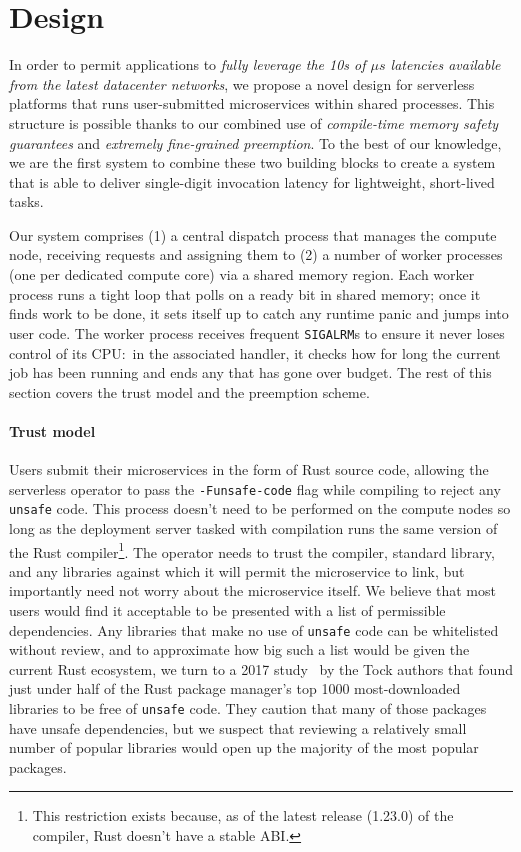 \section{Design}
\label{sec:design}

In order to permit applications to \textit{fully leverage the 10s of $\mu{}s$
latencies available from the latest datacenter networks}, we propose a novel design
for serverless platforms that runs user-submitted microservices within shared
processes.  This structure is possible thanks to our combined use of
\textit{compile-time memory safety guarantees} and \textit{extremely fine-grained
preemption}.  To the best of our knowledge, we are the first system to combine these
two building blocks to create a system that is able to deliver single-digit
invocation latency for lightweight, short-lived tasks.

Our system comprises (1) a central dispatch process that manages the compute node,
receiving requests and assigning them to (2) a number of worker processes (one per
dedicated compute core) via a shared memory region.  Each worker process runs a
tight loop that polls on a ready bit in shared memory; once it finds work to be done,
it sets itself up to catch any runtime panic and jumps into user code.  The worker
process receives frequent \texttt{SIGALRM}s to ensure it never loses control of its
CPU:\ in the associated handler, it checks how for long the current job has been
running and ends any that has gone over budget.  The rest of this section covers the
trust model and the preemption scheme.

\paragraph{Trust model}
Users submit their microservices in the form of Rust source code, allowing the
serverless operator to pass the \texttt{-Funsafe-code} flag while compiling to reject
any \texttt{unsafe} code.  This process doesn't need to be performed on the compute
nodes so long as the deployment server tasked with compilation runs the same version
of the Rust compiler\footnote{This restriction exists because, as of the latest
release (1.23.0) of the compiler, Rust doesn't have a stable ABI.}.  The operator
needs to trust the compiler, standard library, and any libraries against which it
will permit the microservice to link, but importantly need not worry about the
microservice itself.  We believe that most users would find it acceptable to be
presented with a list of permissible dependencies.  Any libraries that make no use of
\texttt{unsafe} code can be whitelisted without review, and to approximate how big
such a list would be given the current Rust ecosystem, we turn to a 2017
study~\cite{www-cratesio-unsafe} by the Tock authors that found just under half of
the Rust package manager's top 1000 most-downloaded libraries to be free of
\texttt{unsafe} code.  They caution that many of those packages have unsafe
dependencies, but we suspect that reviewing a relatively small number of popular
libraries would open up the majority of the most popular packages.

